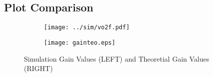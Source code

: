\vspace{2cm}


\subsection{Plot Comparison}

\vspace{-3cm}

\begin{figure}[ht]
\centering
\begin{subfigure}{.5\textwidth}
  \centering
  \texttt{[image: ../sim/vo2f.pdf]}
\end{subfigure}%
\begin{subfigure}{.5\textwidth}
  \centering
  \vspace{3cm}
  \texttt{[image: gainteo.eps]}
\end{subfigure}
\caption{Simulation Gain Values (LEFT) and Theoretial Gain Values (RIGHT)}
\label{fig:sbs3}
\end{figure}



